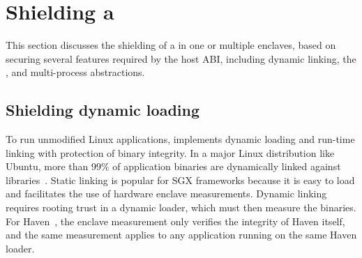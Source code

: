 \section{Shielding a \libos{}}
\label{sec:sgx:shield}


This section discusses
the shielding of a \libos{} in one or multiple enclaves,
based on
securing several features
required by the host ABI, including dynamic linking, the \hostapis{}, and multi-process abstractions.




\subsection{Shielding dynamic loading}
\label{sec:sgx:shield:loading}


To run unmodified Linux applications,
\graphenesgx{} implements dynamic loading and run-time linking
with protection of binary integrity.
In a major Linux distribution like Ubuntu, more than 99\% of application binaries are dynamically linked against libraries~\cite{tsai16apistudy}.
Static linking is popular for SGX frameworks because it is easy to load and 
facilitates the use of hardware enclave measurements. %
Dynamic linking requires rooting trust in a dynamic loader, which must then measure the binaries.
For Haven~\cite{baumann14haven}, the enclave measurement only verifies the integrity of Haven itself,
and the same measurement
applies to any application running on the same Haven loader.



